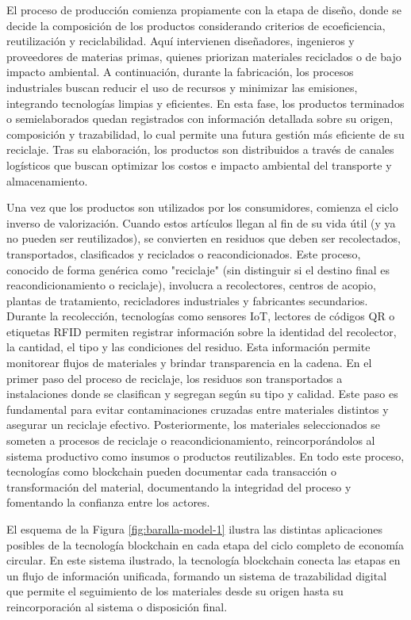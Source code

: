 El proceso de producción comienza propiamente con la etapa de diseño, donde se decide la composición de los productos considerando criterios de ecoeficiencia, reutilización y reciclabilidad. Aquí intervienen diseñadores, ingenieros y proveedores de materias primas, quienes priorizan materiales reciclados o de bajo impacto ambiental. A continuación, durante la fabricación, los procesos industriales buscan reducir el uso de recursos y minimizar las emisiones, integrando tecnologías limpias y eficientes. En esta fase, los productos terminados o semielaborados quedan registrados con información detallada sobre su origen, composición y trazabilidad, lo cual permite una futura gestión más eficiente de su reciclaje. Tras su elaboración, los productos son distribuidos a través de canales logísticos que buscan optimizar los costos e impacto ambiental del transporte y almacenamiento.

Una vez que los productos son utilizados por los consumidores, comienza el ciclo inverso de valorización. Cuando estos artículos llegan al fin de su vida útil (y ya no pueden ser reutilizados), se convierten en residuos que deben ser recolectados, transportados, clasificados y reciclados o reacondicionados. Este proceso, conocido de forma genérica como "reciclaje" (sin distinguir si el destino final es reacondicionamiento o reciclaje), involucra a recolectores, centros de acopio, plantas de tratamiento, recicladores industriales y fabricantes secundarios. Durante la recolección, tecnologías como sensores IoT, lectores de códigos QR o etiquetas RFID permiten registrar información sobre la identidad del recolector, la cantidad, el tipo y las condiciones del residuo. Esta información permite monitorear flujos de materiales y brindar transparencia en la cadena. En el primer paso del proceso de reciclaje, los residuos son transportados a instalaciones donde se clasifican y segregan según su tipo y calidad. Este paso es fundamental para evitar contaminaciones cruzadas entre materiales distintos y asegurar un reciclaje efectivo. Posteriormente, los materiales seleccionados se someten a procesos de reciclaje o reacondicionamiento, reincorporándolos al sistema productivo como insumos o productos reutilizables. En todo este proceso, tecnologías como blockchain pueden documentar cada transacción o transformación del material, documentando la integridad del proceso y fomentando la confianza entre los actores.

El esquema de la Figura \ref{fig:baralla-model-1} ilustra las distintas aplicaciones posibles de la tecnología blockchain en cada etapa del ciclo completo de economía circular. En este sistema ilustrado, la tecnología blockchain conecta las etapas en un flujo de información unificada, formando un sistema de trazabilidad digital que permite el seguimiento de los materiales desde su origen hasta su reincorporación al sistema o disposición final.

